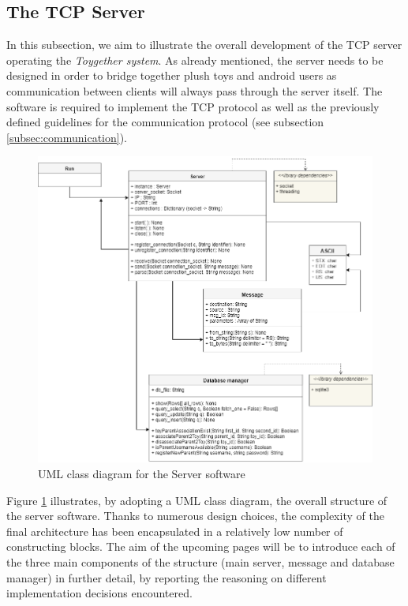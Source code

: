 \newpage
\subsection{The TCP Server}
\label{subsec:server} 

In this subsection, we aim to illustrate the overall development of the TCP server operating the \textit{Toygether system}. As already mentioned, the server needs to be designed in order to bridge together plush toys and android users as communication between clients will always pass through the server itself. The software is required to implement the TCP protocol as well as the previously defined guidelines for the communication protocol (see subsection \ref{subsec:communication}).

\begin{figure}[ht]
    \centering
    \includegraphics[scale=0.5]{images/SE_UML_server.png}
    \caption{UML class diagram for the Server software}
    \label{fig:SE_uml_server}
\end{figure}

Figure \ref{fig:SE_uml_server} illustrates, by adopting a UML class diagram, the overall structure of the server software. Thanks to numerous design choices, the complexity of the final architecture has been encapsulated in a relatively low number of constructing blocks. The aim of the upcoming pages will be to introduce each of the three main components of the structure (main server, message and database manager) in further detail, by reporting the reasoning on different implementation decisions encountered.

